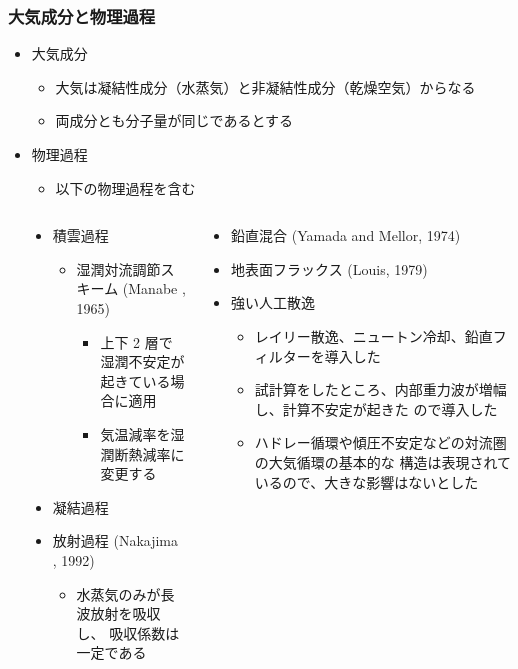 \documentclass[aspectratio=149,9pt,fleqn]{beamer}
\begin{document}
\begin{frame}
	\frametitle{大気成分と物理過程}
	\begin{itemize}
		\item 大気成分
			\begin{itemize}
				\item 大気は凝結性成分（水蒸気）と非凝結性成分（乾燥空気）からなる
				\item 両成分とも分子量が同じであるとする
			\end{itemize}
		\item 物理過程
			\begin{itemize}
				\item 以下の物理過程を含む
			\end{itemize}
	\end{itemize}
	\begin{columns}[onlytextwidth,T]
		\begin{column}{.05\textwidth}
		\end{column}
		\begin{column}{.45\textwidth}
			\begin{itemize}
				\item 積雲過程
					\begin{itemize}
						\item 湿潤対流調節スキーム (Manabe \etal*, 1965)
							\begin{itemize}
								\item 上下 2 層で湿潤不安定が起きている場合に適用
								\item 気温減率を湿潤断熱減率に変更する
							\end{itemize}
					\end{itemize}
				\item 凝結過程
				\item 放射過程 (Nakajima \etal*, 1992)
					\begin{itemize}
						\item 水蒸気のみが長波放射を吸収し、
							吸収係数は一定である
					\end{itemize}
			\end{itemize}
		\end{column}
		\begin{column}{.45\textwidth}
			\begin{itemize}
				\item 鉛直混合 (Yamada and Mellor, 1974)
				\item 地表面フラックス (Louis, 1979)
				\item 強い人工散逸
					\begin{itemize}
						\item レイリー散逸、ニュートン冷却、鉛直フィルターを導入した
						\item 試計算をしたところ、内部重力波が増幅し、計算不安定が起きた
							ので導入した
						\item ハドレー循環や傾圧不安定などの対流圏の大気循環の基本的な
							構造は表現されているので、大きな影響はないとした
					\end{itemize}
			\end{itemize}
		\end{column}
	\end{columns}
\end{frame}
\end{document}
